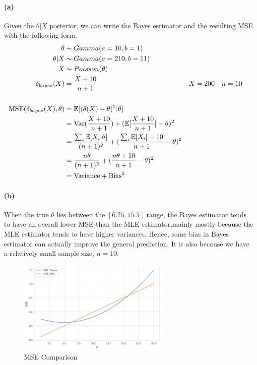\documentclass[11pt, letterpaper]{article}
\begin{document}
\paragraph{(a)}
Given the $\theta|X$ posterior, we can write the Bayes estimator and the resulting MSE with the following form.
\begin{align*}
    \theta &\thicksim Gamma(a=10, b=1) \\
    \theta|X &\thicksim Gamma(a=210, b=11) \\
    X &\thicksim Poisson(\theta) \\
    \delta_{bayes}(X) &= \frac{X+10}{n+1} && X=200 \quad n=10 \\ \\ 
    \text{MSE}(\delta_{bayes}(X), \theta) &= \mathbb{E}[(\delta(X) - \theta)^2|\theta] \\
        &= \text{Var}(\frac{X+10}{n+1}) + (\mathbb{E}[\frac{X+10}{n+1}] - \theta)^2 \\
        &= \frac{\sum_i \mathbb{E}[X_i|\theta]}{(n+1)^2} + (\frac{\sum_i \mathbb{E}[X_i] + 10}{n+1} - \theta)^2\\
        &= \frac{n\theta}{(n+1)^2} + (\frac{n\theta + 10}{n+1} - \theta)^2 \\
        &= \text{Variance} + \text{Bias}^2
\end{align*}

\paragraph{(b)}
When the true $\theta$ lies between the $[6.25, 15.5]$ range, the Bayes estimator tends to have an overall lower MSE than the MLE estimator.mainly mostly because the MLE estimator tends to have higher variances. Hence, some bias in Bayes estimator can actually improve the general prediction. It is also because we have a relatively small sample size, $n = 10$.

\begin{figure}[!h]
  \centering
  \includegraphics[width=0.65\textwidth]{2.a.png}
  \captionsetup{justification=centering}
  \caption{MSE Comparison}
\end{figure}
\end{document}
